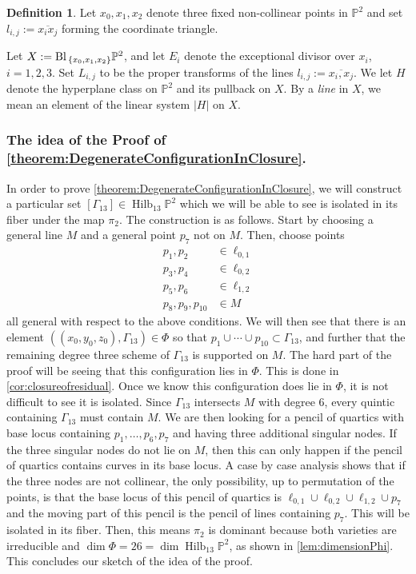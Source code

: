 \documentclass[reqno, 11pt]{amsart}
\theoremstyle{definition}
\theoremstyle{remark}
\numberwithin{equation}{section}
\numberwithin{thm}{section}
\numberwithin{prop}{section}
\numberwithin{lem}{section}
\numberwithin{cor}{section}
\numberwithin{conj}{section}
\numberwithin{defn}{section}
\newcommand{\Bl}{{\text{\rm Bl}\,}}
\theoremstyle{plain}
\theoremstyle{definition}
\newtheorem{definition}[theorem]{Definition}
\newcommand\sssec{\subsubsection}
\newcommand\bp{{\mathbb P}}
\DeclareMathOperator\Hilb{Hilb}
\begin{document}
\begin{definition}
	\label{definition:}
	Let $x_0, x_1, x_2$ denote three fixed non-collinear points in $\bp^2$ and set $l_{i,j} :=\overline{x_{i}x_{j}}$ forming the coordinate triangle. 

Let $X := \Bl_{\{x_{0},x_{1},x_{2}\}}\bp^{2}$, and let $E_{i}$ denote the exceptional divisor over $x_{i}$, $i = 1,2,3$. Set $L_{i,j}$ to be the proper transforms of the lines $l_{i,j} := \overline{x_i, x_j}$.   We let $H$ denote the hyperplane class on $\bp^{2}$ and its pullback on $X$.  By a {\sl line} in $X$, we mean an element of the linear system $|H|$ on $X$.
\end{definition}

\sssec{The idea of the Proof of \autoref{theorem:DegenerateConfigurationInClosure}.}
\label{sssec:degeneration-proof-idea}

In order to prove \autoref{theorem:DegenerateConfigurationInClosure}, we will
construct a particular set $[\Gamma_{13}] \in \Hilb_{13} \bp^2$ which
we will be able to see is isolated in its fiber under the map $\pi_2$.
The construction is as follows. 
Start by choosing a general line $M$ and a general point $p_{7}$
not on $M$. Then, choose points 
\begin{align*}
	p_1, p_2 &\in \ell_{0,1} \\
	p_3, p_4 &\in \ell_{0,2} \\
	p_5, p_6 &\in \ell_{1,2} \\
	p_8, p_9, p_{10} &\in M
\end{align*}
all general with respect to the above conditions.
We will then see that there is an element $(\left( x_0, y_0, z_0 \right), \Gamma_{13}) \in \Phi$ so that $p_1 \cup \cdots \cup p_{10} \subset \Gamma_{13}$,
and further that the remaining degree three scheme of $\Gamma_{13}$ is
supported on $M$. The hard part of the proof will be seeing that this
configuration lies in $\Phi$. This is done in \autoref{cor:closureofresidual}.
Once we know this configuration does lie in $\Phi$, it is not difficult
to see it is isolated. Since $\Gamma_{13}$ intersects $M$ with degree $6$,
every quintic containing $\Gamma_{13}$ must contain $M$. We are then looking
for a pencil of quartics with base locus containing $p_1, \ldots, p_6, p_7$
and having three additional singular nodes.
If the three singular nodes
do not lie on $M$, then this can only happen if the pencil of quartics
contains curves in its base locus. A case by case analysis shows
that if the three nodes are not collinear, the only possibility, up to permutation of the points, is that the base locus of this pencil of quartics is
$\ell_{0,1} \cup \ell_{0,2} \cup \ell_{1,2} \cup p_{7}$ and the moving part
of this pencil is the pencil of lines containing $p_{7}$. This
will be isolated in its fiber. 
Then, this means $\pi_2$ is dominant
because both varieties are irreducible and
$\dim \Phi = 26 = \dim \Hilb_{13}\bp^2$, as shown in \autoref{lem:dimensionPhi}. This concludes our sketch of the idea of the proof.
\end{document}
